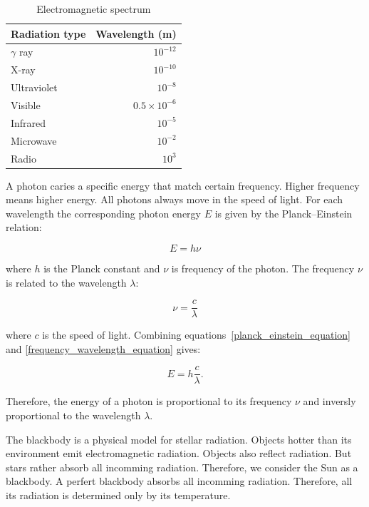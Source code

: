 \begin{table}
	\begin{center}
		\begin{tabular}{|l|r|}
			\hline
			Radiation type & Wavelength (m) \\ \hline \hline
			\(\gamma\) ray & \(10^{-12}\) \\ \hline
			X-ray & \(10^{-10}\) \\ \hline
			Ultraviolet & \(10^{-8}\) \\ \hline
			Visible & \(0.5 \times 10^{-6}\) \\ \hline
			Infrared & \(10^{-5}\) \\ \hline
			Microwave & \(10^{-2}\) \\ \hline
			Radio & \(10^{3}\) \\ \hline
		\end{tabular}
	\end{center}
	\caption{Electromagnetic spectrum}
\end{table}

A photon caries a specific energy that match certain frequency.
Higher frequency means higher energy.
All photons always move in the speed of light.
For each wavelength the corresponding photon energy \(E\) is given by the Planck--Einstein relation:

\begin{equation}
	E = h \nu \label{planck_einstein_equation}
\end{equation}

where \(h\) is the Planck constant and \(\nu\) is frequency of the photon.
The frequency \(\nu\) is related to the wavelength \(\lambda\):

\begin{equation}
	\nu = \frac{c}{\lambda} \label{frequency_wavelength_equation}
\end{equation}

where \(c\) is the speed of light.
Combining equations~\ref{planck_einstein_equation} and \ref{frequency_wavelength_equation} gives:

\begin{equation}
	E = h \frac{c}{\lambda}.
\end{equation}

Therefore, the energy of a photon is proportional to its frequency \(\nu\)
and inversly proportional to the wavelength \(\lambda\).~\cite{trypsteen2017}

The blackbody is a physical model for stellar radiation.
Objects hotter than its environment emit electromagnetic radiation.
Objects also reflect radiation.
But stars rather absorb all incomming radiation.
Therefore, we consider the Sun as a blackbody.
A perfert blackbody absorbs all incomming radiation.
Therefore, all its radiation is determined only by its temperature.~\cite{trypsteen2017}

